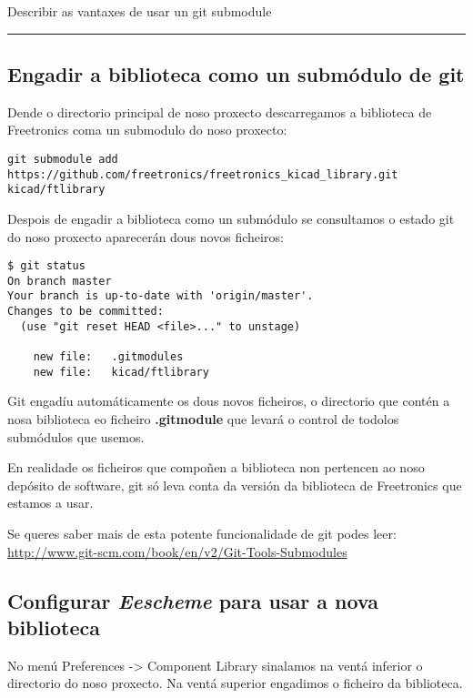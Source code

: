 Describir as vantaxes de usar un git submodule

\begin{center}\rule{0.5\linewidth}{\linethickness}\end{center}

\subsection{Engadir a biblioteca como un submódulo de
git}\label{engadir-a-biblioteca-como-un-submuxf3dulo-de-git}

Dende o directorio principal de noso proxecto descarregamos a biblioteca
de Freetronics coma un submodulo do noso proxecto:

\begin{verbatim}
git submodule add https://github.com/freetronics/freetronics_kicad_library.git kicad/ftlibrary
\end{verbatim}

Despois de engadir a biblioteca como un submódulo se consultamos o
estado git do noso proxecto aparecerán dous novos ficheiros:

\begin{verbatim}
$ git status
On branch master
Your branch is up-to-date with 'origin/master'.
Changes to be committed:
  (use "git reset HEAD <file>..." to unstage)

    new file:   .gitmodules
    new file:   kicad/ftlibrary
\end{verbatim}

Git engadíu automáticamente os dous novos ficheiros, o directorio que
contén a nosa biblioteca eo ficheiro \textbf{.gitmodule} que levará o
control de todolos submódulos que usemos.

En realidade os ficheiros que compoñen a biblioteca non pertencen ao
noso depósito de software, git só leva conta da versión da biblioteca de
Freetronics que estamos a usar.

Se queres saber mais de esta potente funcionalidade de git podes leer:
\url{http://www.git-scm.com/book/en/v2/Git-Tools-Submodules}

\subsection{\texorpdfstring{Configurar \emph{Eescheme} para usar a nova
biblioteca}{Configurar Eescheme para usar a nova biblioteca}}\label{configurar-eescheme-para-usar-a-nova-biblioteca}

No menú Preferences -\textgreater{} Component Library sinalamos na ventá
inferior o directorio do noso proxecto. Na ventá superior engadimos o
ficheiro da biblioteca.

